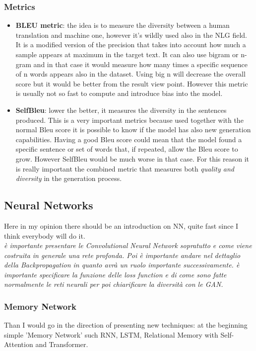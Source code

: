 \subsubsection{Metrics}
\begin{itemize}
	\item \textbf{BLEU metric}: the idea is to measure the diversity between a human translation and machine one, however it’s wildly used also in the NLG field. It is a modified version of the precision that takes into account how much a sample appears at maximum in the target text. It can also use bigram or n-gram and in that case it would measure how many times a specific sequence of n words appears also in the dataset. Using big n will decrease the overall score but it would be better from the result view point. However this metric is usually not so fast to compute and introduce bias into the model.
	\item \textbf{SelfBleu}: lower the better, it measures the diversity in the sentences produced. This is a very important metrics because used together with the normal Bleu score it is possible to know if the model has also new generation capabilities. Having a good Bleu score could mean that the model found a specific sentence or set of words that, if repeated, allow the Bleu score to grow. However SelfBleu would be much worse in that case. For this reason it is really important the combined metric that measures both \textit{quality and diversity} in the generation process.
\end{itemize}




\subsection{Neural Networks}
Here in my opinion there should be an introduction on NN, quite fast since I think everybody will do it. \\
\textit{è importante presentare le Convolutional Neural Network sopratutto e come viene costruita in generale una rete profonda. Poi è importante andare nel dettaglio della Backpropagation in quanto avrà un ruolo importante successivamente. è importante specificare la funzione delle loss function e di come sono fatte normalmente le reti neurali per poi chiarificare la diversità con le GAN.}
\subsubsection{Memory Network}
Than I would go in the direction of presenting new techniques: at the beginning simple 'Memory Network' such RNN, LSTM, Relational Memory with Self-Attention and Transformer. \\
